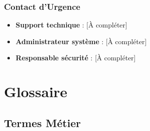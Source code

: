 \documentclass[12pt,a4paper]{report}
\begin{document}
\subsection{Contact d'Urgence}

\begin{itemize}[leftmargin=*]
    \item \textbf{Support technique} : [À compléter]
    \item \textbf{Administrateur système} : [À compléter]
    \item \textbf{Responsable sécurité} : [À compléter]
\end{itemize}

\chapter{Glossaire}

\section{Termes Métier}
\end{document}
